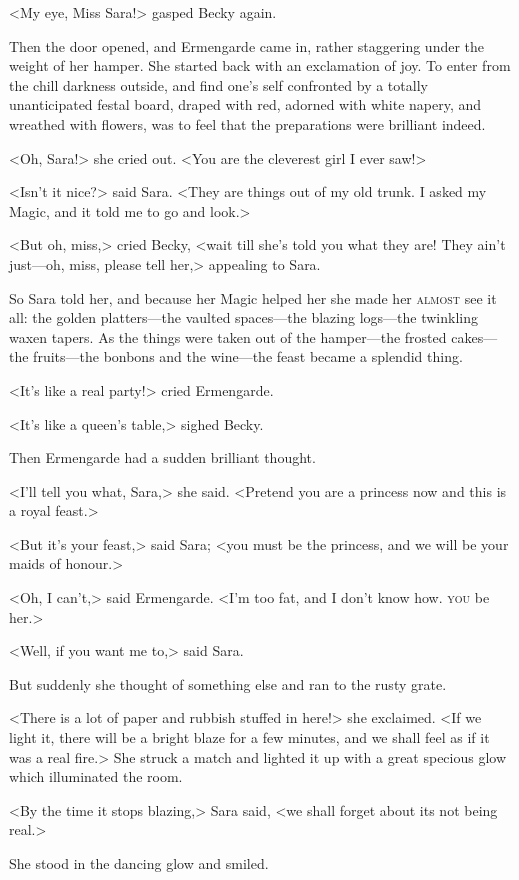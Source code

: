 <My eye, Miss Sara!> gasped Becky again.

Then the door opened, and Ermengarde came in, rather staggering under the weight of her hamper. She started back with an exclamation of joy. To enter from the chill darkness outside, and find one's self confronted by a totally unanticipated festal board, draped with red, adorned with white napery, and wreathed with flowers, was to feel that the preparations were brilliant indeed.

<Oh, Sara!> she cried out. <You are the cleverest girl I ever saw!>

<Isn't it nice?> said Sara. <They are things out of my old trunk. I asked my Magic, and it told me to go and look.>

<But oh, miss,> cried Becky, <wait till she's told you what they are! They ain't just—oh, miss, please tell her,> appealing to Sara.

So Sara told her, and because her Magic helped her she made her \textsc{almost} see it all: the golden platters—the vaulted spaces—the blazing logs—the twinkling waxen tapers. As the things were taken out of the hamper—the frosted cakes—the fruits—the bonbons and the wine—the feast became a splendid thing.

<It's like a real party!> cried Ermengarde.

<It's like a queen's table,> sighed Becky.

Then Ermengarde had a sudden brilliant thought.

<I'll tell you what, Sara,> she said. <Pretend you are a princess now and this is a royal feast.>

<But it's your feast,> said Sara; <you must be the princess, and we will be your maids of honour.>

<Oh, I can't,> said Ermengarde. <I'm too fat, and I don't know how. \textsc{you} be her.>

<Well, if you want me to,> said Sara.

But suddenly she thought of something else and ran to the rusty grate.

<There is a lot of paper and rubbish stuffed in here!> she exclaimed. <If we light it, there will be a bright blaze for a few minutes, and we shall feel as if it was a real fire.> She struck a match and lighted it up with a great specious glow which illuminated the room.

<By the time it stops blazing,> Sara said, <we shall forget about its not being real.>

She stood in the dancing glow and smiled.

